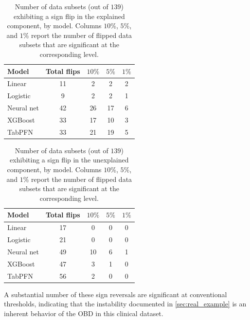 \begin{table}[!ht]
    \caption{Number of data subsets (out of $139$) exhibiting a sign flip in the explained component, by model. Columns $10\%$, $5\%$, and $1\%$ report the number of flipped data subsets that are significant at the corresponding level.}
    \label{tab:flip_summary_explained}
    \centering
    \small
    \begin{tabular}{lcccc}
    \toprule
    Model & Total flips & $10\%$ & $5\%$ & $1\%$ \\
    \midrule
    Linear      & 11 &  2 &  2 &  2 \\
    Logistic    &  9 &  2 &  2 &  1 \\
    Neural net  & 42 & 26 & 17 &  6 \\
    XGBoost     & 33 & 17 & 10 & 3 \\
    TabPFN      & 33 & 21 & 19 & 5 \\
    \bottomrule
    \end{tabular}
\end{table}

\begin{table}[!ht]
    \caption{Number of data subsets (out of $139$) exhibiting a sign flip in the unexplained component, by model. Columns $10\%$, $5\%$, and $1\%$ report the number of flipped data subsets that are significant at the corresponding level.}
    \label{tab:flip_summary_unexplained}
    \centering
    \small
    \begin{tabular}{lcccc}
    \toprule
    Model & Total flips & $10\%$ & $5\%$ & $1\%$ \\
    \midrule
    Linear      & 17 &  0 &  0 &  0 \\
    Logistic    & 21 &  0 &  0 &  0 \\
    Neural net  & 49 & 10 &  6 &  1 \\
    XGBoost     & 47 & 3 &  1 &  0 \\
    TabPFN      & 56 & 2 &  0 &  0 \\
    \bottomrule
    \end{tabular}
\end{table}

A substantial number of these sign reversals are significant at conventional thresholds, indicating that the instability documented in \cref{sec:real_example} is an inherent behavior of the OBD in this clinical dataset.


